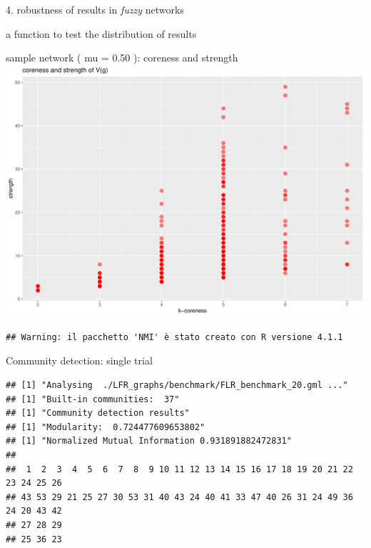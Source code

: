 \documentclass[
  ignorenonframetext,
]{beamer}
\begin{document}
\begin{frame}[fragile]{4. robustness of results in \emph{fuzzy}
networks}
\protect\hypertarget{robustness-of-results-in-fuzzy-networks}{}
\begin{block}{a function to test the distribution of results}
\protect\hypertarget{a-function-to-test-the-distribution-of-results}{}
\end{block}

\begin{block}{sample network ( mu = 0.50 ): coreness and strength}
\protect\hypertarget{sample-network-mu-0.50-coreness-and-strength-1}{}
\includegraphics{presentation1_files/figure-beamer/unnamed-chunk-14-1.pdf}

\begin{verbatim}
## Warning: il pacchetto 'NMI' è stato creato con R versione 4.1.1
\end{verbatim}
\end{block}
\end{frame}

\begin{frame}[fragile]{Community detection: single trial}
\protect\hypertarget{community-detection-single-trial}{}
\begin{verbatim}
## [1] "Analysing  ./LFR_graphs/benchmark/FLR_benchmark_20.gml ..."
## [1] "Built-in communities:  37"
## [1] "Community detection results"
## [1] "Modularity:  0.724477609653802"
## [1] "Normalized Mutual Information 0.931891882472831"
## 
##  1  2  3  4  5  6  7  8  9 10 11 12 13 14 15 16 17 18 19 20 21 22 23 24 25 26 
## 43 53 29 21 25 27 30 53 31 40 43 24 40 41 33 47 40 26 31 24 49 36 24 20 43 42 
## 27 28 29 
## 25 36 23
\end{verbatim}
\end{frame}
\end{document}
